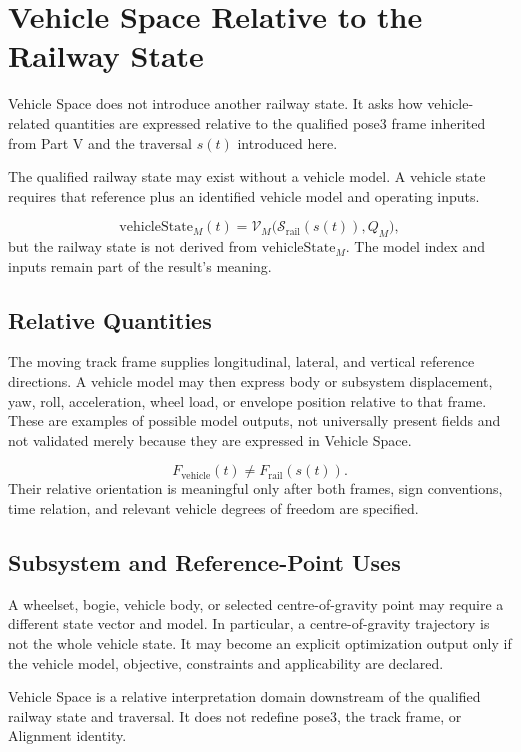\chapter{Vehicle Space Relative to the Railway State}
\label{chap:vehicle-space}

Vehicle Space does not introduce another railway state. It asks how
vehicle-related quantities are expressed relative to the qualified pose3
frame inherited from Part V and the traversal \(s(t)\) introduced here.

\begin{principle}
The qualified railway state may exist without a vehicle model. A vehicle
state requires that reference plus an identified vehicle model and operating
inputs.
\end{principle}

\begin{proposition}
\label{prop:state-hierarchy}
\[
\mathrm{vehicleState}_M(t)
=
\mathcal V_M\bigl(
\mathcal S_{\mathrm{rail}}(s(t)),Q_M
\bigr),
\]
but the railway state is not derived from
\(\mathrm{vehicleState}_M\). The model index and inputs remain part of the
result's meaning.
\end{proposition}

\section{Relative Quantities}

The moving track frame supplies longitudinal, lateral, and vertical reference
directions. A vehicle model may then express body or subsystem displacement,
yaw, roll, acceleration, wheel load, or envelope position relative to that
frame. These are examples of possible model outputs, not universally present
fields and not validated merely because they are expressed in Vehicle Space.

\[
F_{\mathrm{vehicle}}(t)\neq
F_{\mathrm{rail}}(s(t)).
\]
Their relative orientation is meaningful only after both frames, sign
conventions, time relation, and relevant vehicle degrees of freedom are
specified.

\section{Subsystem and Reference-Point Uses}

A wheelset, bogie, vehicle body, or selected centre-of-gravity point may
require a different state vector and model. In particular, a
centre-of-gravity trajectory is not the whole vehicle state. It may become an
explicit optimization output only if the vehicle model, objective, constraints
and applicability are declared.

\begin{summary}
Vehicle Space is a relative interpretation domain downstream of the qualified
railway state and traversal. It does not redefine pose3, the track frame, or
Alignment identity.
\end{summary}
